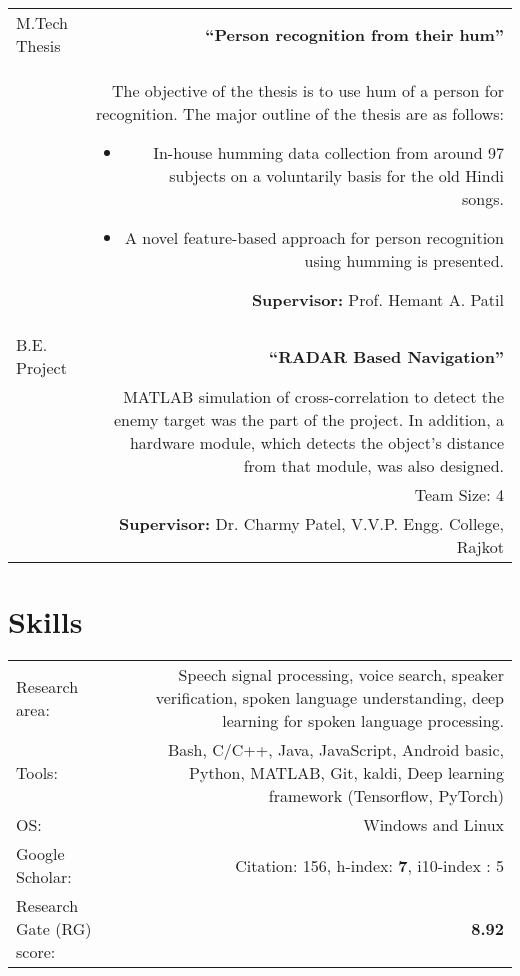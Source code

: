 \documentclass[10pt]{article}
\begin{document}
\begin{tabular}{L!{\VRule}R}
M.Tech Thesis&\textbf{``Person recognition from their hum''}\\&The objective of the thesis is to use hum of a person for recognition. The major outline of the thesis are as follows: 
\vspace{-0.3cm}
\begin{itemize}
	\setlength\itemsep{0em}
	\item In-house humming data collection from around 97 subjects on a voluntarily basis for the old Hindi songs. 
	\item A novel feature-based approach for person recognition using humming is presented.
\end{itemize} 
\textbf{Supervisor:} Prof. Hemant A. Patil\vspace{0.5cm}\\
B.E. Project&\textbf{``RADAR Based Navigation''}\\&MATLAB simulation of cross-correlation to detect the enemy target was the part of the project. In addition, a hardware module, which detects the object's  distance from that module, was also designed.\\& Team Size: 4\\&\vspace{0.01cm} \textbf{Supervisor:} Dr. Charmy Patel, V.V.P. Engg. College, Rajkot
\end{tabular}
\vspace*{0.3cm}
\section*{Skills}
\begin{tabular}{L!{\VRule}R}
Research area: &Speech signal processing, voice search, speaker verification, spoken language understanding, deep learning for spoken language processing.\vspace{0.2cm}\\
Tools:& Bash, C/C++, Java, JavaScript, Android basic, Python, MATLAB,  Git, kaldi, Deep learning framework (Tensorflow, PyTorch) \vspace{0.2cm}\\
OS: & Windows and Linux \vspace{0.2cm}\\
Google Scholar: & {Citation}: 156, {h-index}: \textbf{7}, {i10-index} : 5 \vspace{0.2cm}\\
Research Gate (RG) score: & \textbf{8.92}
\end{tabular}
\end{document}
